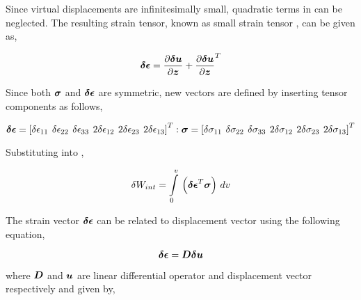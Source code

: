 Since virtual displacements are infinitesimally small, quadratic terms in
 can be neglected.  The resulting
strain tensor, known as small strain tensor \vect{\epsilon}, can be given as,

\begin{equation}
  \vect{\delta \epsilon}=\delby{\vect{\delta u}}{\vect{z}} + \transpose{\delby{\vect{\delta u}}{\vect{z}}} 
  \label{eqn:virtualsmalldisplacement}
\end{equation}
 
Since both $\vect{\sigma}$ and $\vect{\delta \epsilon}$ are symmetric, new
vectors are defined by inserting tensor components as follows,

\begin{equation}
  \vect{\delta \epsilon}=\transpose{\sqbrac{\delta \epsilon_{11} \hspace{4 pt} \delta \epsilon_{22} \hspace{4 pt} \delta \epsilon_{33} 
      \hspace{4 pt} 2\delta \epsilon_{12} \hspace{4 pt} 2\delta \epsilon_{23} \hspace{4 pt} 2\delta \epsilon_{13}}} :
  \vect{\sigma}=\transpose{\sqbrac{\delta \sigma_{11} \hspace{4 pt} \delta \sigma_{22} \hspace{4 pt} \delta \sigma_{33} 
      \hspace{4 pt} 2\delta \sigma_{12} \hspace{4 pt} 2\delta \sigma_{23} \hspace{4 pt} 2\delta \sigma_{13} }}	  		  
  \label{eqn:newvectors}
\end{equation} 

Substituting  into ,

\begin{equation}
  \delta W_{int}=\gint{0}{v}{\pbrac{\transpose{\vect{\delta \epsilon}} \vect{\sigma}}}v
  \label{eqn:virtualenergy1}
\end{equation}

The strain vector $\vect{\delta \epsilon}$ can be related to displacement
vector using the following equation,

\begin{equation}
  \vect{\delta \epsilon}=\matr{D} \vect{\delta u} 
  \label{eqn:virtualsmalldisplacement1}
\end{equation}

\noindent where $\matr{D}$ and $\vect{u}$ are linear differential operator and
displacement vector respectively and given by,

